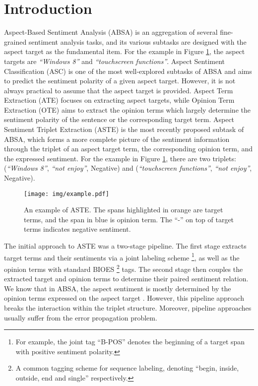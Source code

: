 \documentclass[11pt,a4paper]{article}
\begin{document}
\section{Introduction}
\label{sec:intro}
Aspect-Based Sentiment Analysis (ABSA) \cite{liu2012sentiment, pontiki-EtAl:2014:SemEval} is an aggregation of several fine-grained sentiment analysis tasks, 
and its various subtasks 
are designed with the aspect target as the fundamental item.
For the example in Figure \ref{fig:example}, the aspect targets are \textit{``Windows 8''} and \textit{``touchscreen functions''}.
Aspect Sentiment Classification (ASC) \cite{dong2014adaptive, zhang2016gated, Yang2017AttentionBL, tnet2018, Tang:ACL2019} is one of the most well-explored subtasks of ABSA and aims to predict the sentiment polarity of a given aspect target.
However, it is not always practical to assume that the aspect target is provided.
Aspect Term Extraction (ATE) \cite{yin2016unsupervised, li2018aspect, ma-etal-2019-exploring} focuses on extracting aspect targets, while Opinion Term Extraction (OTE) \cite{yang-cardie-2012-extracting, kinger2013, yang-cardie-2013-joint}
aims to extract the opinion terms which largely determine the sentiment polarity of the sentence or the corresponding target term.
Aspect Sentiment Triplet Extraction (ASTE) \cite{peng2019knowing} is the most recently proposed subtask of ABSA, which forms 
a more complete picture of the sentiment information through the triplet of an aspect target term, the corresponding opinion term, and the expressed sentiment.
For the example in Figure \ref{fig:example}, there are two triplets: (\textit{``Windows 8''},  \textit{``not enjoy''}, Negative) and (\textit{``touchscreen functions''}, \textit{``not enjoy''}, Negative).



\begin{figure}[!t]
\centering
\texttt{[image: img/example.pdf]}
\caption{An example of ASTE. The spans highlighted in orange are target terms, and the span in blue is opinion term. The ``-'' on top of target terms indicates negative sentiment.}
\label{fig:example}
\end{figure}



The initial approach to ASTE \cite{peng2019knowing} was a two-stage pipeline.
The first stage extracts target terms and their sentiments via a joint labeling scheme 
\footnote{For example, the joint tag ``B-POS'' denotes the beginning of a target span with positive sentiment polarity.},
as well as the opinion terms with standard BIOES \footnote{A common tagging scheme for sequence labeling, denoting “begin, inside, outside, end and single” respectively.}
tags.
The second stage then couples the extracted target and opinion terms to determine their paired sentiment relation.
We know that in ABSA, the aspect sentiment is mostly determined by the opinion terms expressed on the aspect target \cite{qiu-etal-2011-opinion, yang-cardie-2012-extracting}. 
However, this pipeline approach breaks the interaction within the triplet structure. 
Moreover, pipeline approaches usually suffer from the error propagation problem.
\end{document}
